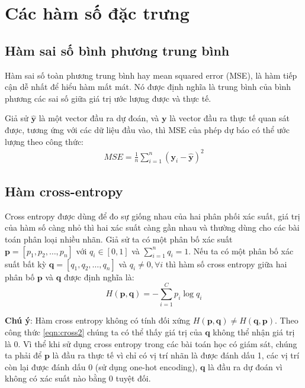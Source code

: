 \section{Các hàm số đặc trưng}
\subsection{Hàm sai số bình phương trung bình}
\label{sub:mse}
Hàm sai số toàn phương trung bình hay mean squared error (MSE), là hàm tiếp cận dễ nhất để hiểu hàm mất mát. Nó được định nghĩa là trung bình của bình phương các sai số giữa giá trị ước lượng được và thực tế.\par
Giả sử $\widehat{\textbf{y}}$ là một vector đầu ra dự đoán, và $\textbf{y}$ là vector đầu ra thực tế quan sát được, tương ứng với các dữ liệu đầu vào, thì MSE của phép dự báo có thể ước lượng theo công thức:
\begin{align}
MSE = 
\frac{1}{n}
\sum_{i=1}^{n} (\textbf{y}_i - \widehat{\textbf{y}})^{2}
\end{align}
\subsection{Hàm cross-entropy}
\label{sub:cross_entropy_func}
Cross entropy \cite{mlcb} được dùng để đo sự giống nhau của hai phân phối xác suất, giá trị của hàm số càng nhỏ thì hai xác suất càng gần nhau và thường dùng cho các bài toán phân loại nhiều nhãn. Giả sử ta có một phân bố xác suất $\textbf{p} = [p_1, p_2,\dots, p_n]$ với $q_i \in [0,1]$ và $\sum_{i=1}^{n} q_i = 1$. Nếu ta có một phân bố xác suất bất kỳ $\textbf{q} = [q_1, q_2, \dots, q_n]$ và $q_i \neq 0, \forall i$ thì hàm số cross entropy giữa hai phân bố $\textbf{p}$ và $\textbf{q}$ được định nghĩa là:
\begin{equation}
\label{eqn:cross2}
H(\textbf{p}, \textbf{q}) =-\sum_{i=1}^C p_i \log q_i 
\end{equation}\par

\textbf{Chú ý}: Hàm cross entropy không có tính đối xứng $H(\textbf{p}, \textbf{q}) \neq H(\textbf{q}, \textbf{p})$. Theo công thức \ref{eqn:cross2} chúng ta có thể thấy giá trị của $\textbf{q}$ không thể nhận giá trị là 0. Vì thể khi sử dụng cross entropy trong các bài toán học có giám sát, chúng ta phải để $\textbf{p}$ là đầu ra thực tế vì chỉ có vị trí nhãn là được đánh dấu 1, các vị trí còn lại được đánh dấu 0 (sử dụng one-hot encoding), $\textbf{q}$ là đầu ra dự đoán vì không có xác suất nào bằng 0 tuyệt đối.



